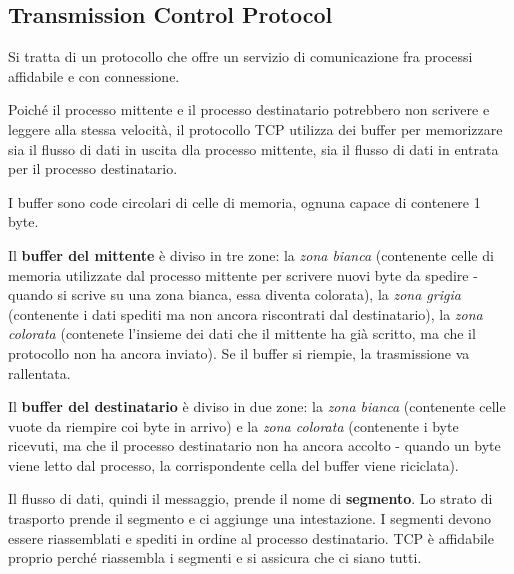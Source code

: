 \subsection{Transmission Control Protocol}

    Si tratta di un protocollo che offre un servizio di comunicazione fra processi affidabile e con connessione.
    
    \vspace{3mm}
    
    Poiché il processo mittente e il processo destinatario potrebbero non scrivere e leggere alla stessa velocità, il protocollo TCP utilizza dei buffer per memorizzare sia il flusso di dati in uscita dla processo mittente, sia il flusso di dati in entrata per il processo destinatario.
    
    \vspace{3mm}
    
    I buffer sono code circolari di celle di memoria, ognuna capace di contenere 1 byte. 
    
    \vspace{3mm}
    
    Il \textbf{buffer del mittente} è diviso in tre zone: la \textit{zona bianca} (contenente celle di memoria utilizzate dal processo mittente per scrivere nuovi byte da spedire - quando si scrive su una zona bianca, essa diventa colorata), la \textit{zona grigia} (contenente i dati spediti ma non ancora riscontrati dal destinatario), la \textit{zona colorata} (contenete l'insieme dei dati che il mittente ha già scritto, ma che il protocollo non ha ancora inviato). Se il buffer si riempie, la trasmissione va rallentata.
    
    \vspace{3mm}
    
    Il \textbf{buffer del destinatario} è diviso in due zone: la \textit{zona bianca} (contenente celle vuote da riempire coi byte in arrivo) e la \textit{zona colorata} (contenente i byte ricevuti, ma che il processo destinatario non ha ancora accolto - quando un byte viene letto dal processo, la corrispondente cella del buffer viene riciclata).
    
    \vspace{3mm}
    
    Il flusso di dati, quindi il messaggio, prende il nome di \textbf{segmento}. Lo strato di trasporto prende il segmento e ci aggiunge una intestazione. I segmenti devono essere riassemblati e spediti in ordine al processo destinatario. TCP è affidabile proprio perché riassembla i segmenti e si assicura che ci siano tutti.
    

